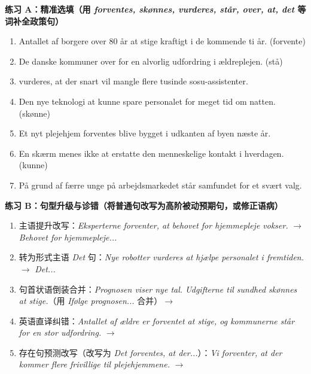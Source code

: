 \textbf{练习 A：精准选填（用 \textit{forventes, skønnes, vurderes, står, over, at, det} 等词补全政策句）}
\begin{enumerate}
  \item Antallet af borgere over 80 år \underline{\hspace{2.2cm}} at stige kraftigt i de kommende ti år. (forvente)
  \item De danske kommuner \underline{\hspace{2.2cm}} over for en alvorlig udfordring i ældreplejen. (stå)
  \item \underline{\hspace{2.2cm}} vurderes, at der snart vil mangle flere tusinde sosu-assistenter.
  \item Den nye teknologi \underline{\hspace{2.2cm}} at kunne spare personalet for meget tid om natten. (skønne)
  \item Et nyt plejehjem forventes \underline{\hspace{2.2cm}} blive bygget i udkanten af byen næste år.
  \item En skærm menes ikke at \underline{\hspace{2.2cm}} erstatte den menneskelige kontakt i hverdagen. (kunne)
  \item På grund af færre unge på arbejdsmarkedet står samfundet \underline{\hspace{2.2cm}} for et svært valg.
\end{enumerate}

\textbf{练习 B：句型升级与诊错（将普通句改写为高阶被动预期句，或修正语病）}
\begin{enumerate}
  \item 主语提升改写：\textit{Eksperterne forventer, at behovet for hjemmepleje vokser.} $\rightarrow$ \textit{Behovet for hjemmepleje...}
  \item 转为形式主语 \textit{Det} 句：\textit{Nye robotter vurderes at hjælpe personalet i fremtiden.} $\rightarrow$ \textit{Det...}
  \item 句首状语倒装合并：\textit{Prognosen viser nye tal. Udgifterne til sundhed skønnes at stige.}（用 \textit{Ifølge prognosen...} 合并）$\rightarrow$
  \item 英语直译纠错：\textit{Antallet af ældre er forventet at stige, og kommunerne står for en stor udfordring.} $\rightarrow$
  \item 存在句预测改写（改写为 \textit{Det forventes, at der...}）：\textit{Vi forventer, at der kommer flere frivillige til plejehjemmene.} $\rightarrow$
\end{enumerate}

